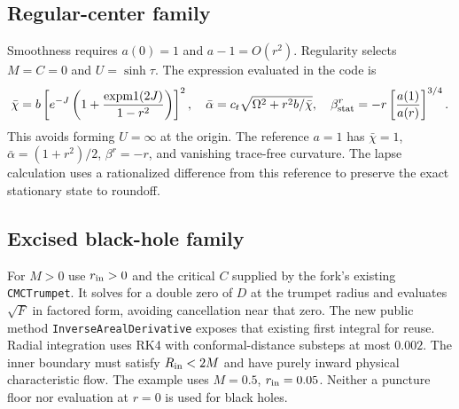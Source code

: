 \documentclass[11pt]{article}
\newcommand{\Om}{\Omega}
\newcommand{\bc}{\bar\chi}
\newcommand{\ba}{\bar\alpha}
\newcommand{\pathfile}[1]{\nolinkurl{#1}}
\begin{document}
\subsection{Regular-center family}
Smoothness requires $a(0)=1$ and $a-1=O(r^2)$. Regularity selects $M=C=0$ and
$U=\sinh\tau$. The expression evaluated in the code is
\begin{equation}
 \bc=b\left[e^{-J}\left(1+\frac{\operatorname{expm1}(2J)}{1-r^2}\right)\right]^2,
 \quad \ba=c_t\sqrt{\Om^2+r^2b/\bc},\quad
 \beta_{\rm stat}^r=-r\left[\frac{a(1)}{a(r)}\right]^{3/4}.
\end{equation}
This avoids forming $U=\infty$ at the origin. The reference $a=1$ has
$\bc=1$, $\ba=(1+r^2)/2$, $\beta^r=-r$, and vanishing trace-free curvature.
The lapse calculation uses a rationalized difference from this reference to
preserve the exact stationary state to roundoff.

\subsection{Excised black-hole family}
For $M>0$ use $r_{\rm in}>0$ and the critical $C$ supplied by the fork's existing
\pathfile{CMCTrumpet}. It solves for a double zero of $D$ at the trumpet radius
and evaluates $\sqrt F$ in factored form, avoiding cancellation near that zero.
The new public method \pathfile{InverseArealDerivative} exposes that existing
first integral for reuse. Radial integration uses RK4 with conformal-distance
substeps at most $0.002$. The inner boundary must satisfy $R_{\rm in}<2M$ and
have purely inward physical characteristic flow. The example uses $M=0.5$,
$r_{\rm in}=0.05$. Neither a puncture floor nor evaluation at $r=0$ is used for
black holes.
\end{document}
